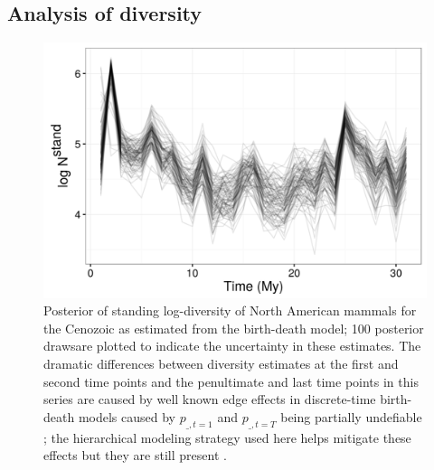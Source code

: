 \documentclass[12pt,letterpaper]{article}
\begin{document}
\subsection*{Analysis of diversity}
\begin{figure}[ht]
  \centering
  \includegraphics[width=\textwidth,height=0.8\textheight,keepaspectratio=true]{figure/log_diversity}
  \caption[Estimated mammal log-diversity for the Cenozoic]{Posterior of standing log-diversity of North American mammals for the Cenozoic as estimated from the birth-death model; 100 posterior drawsare plotted to indicate the uncertainty in these estimates. The dramatic differences between diversity estimates at the first and second time points and the penultimate and last time points in this series are caused by well known edge effects in discrete-time birth-death models caused by \(p_{\_, t = 1}\) and \(p_{\_, t = T}\) being partially undefiable \citep{Royle2008}; the hierarchical modeling strategy used here helps mitigate these effects but they are still present \citep{Gelman2013d,Royle2008}.}
  \label{fig:diversity_est}
\end{figure}
\end{document}
